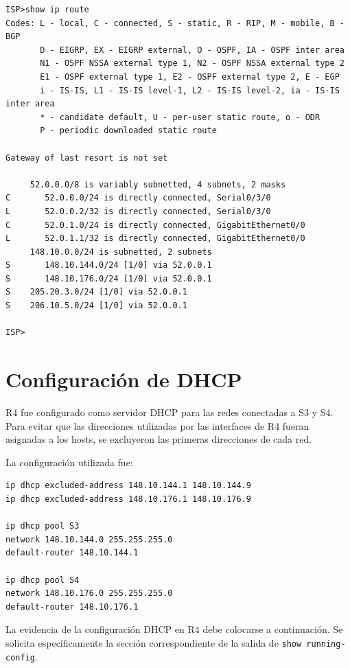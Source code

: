 \documentclass[12pt,a4paper]{article}
\begin{document}
\begin{verbatim}
ISP>show ip route
Codes: L - local, C - connected, S - static, R - RIP, M - mobile, B - BGP
       D - EIGRP, EX - EIGRP external, O - OSPF, IA - OSPF inter area
       N1 - OSPF NSSA external type 1, N2 - OSPF NSSA external type 2
       E1 - OSPF external type 1, E2 - OSPF external type 2, E - EGP
       i - IS-IS, L1 - IS-IS level-1, L2 - IS-IS level-2, ia - IS-IS inter area
       * - candidate default, U - per-user static route, o - ODR
       P - periodic downloaded static route

Gateway of last resort is not set

     52.0.0.0/8 is variably subnetted, 4 subnets, 2 masks
C       52.0.0.0/24 is directly connected, Serial0/3/0
L       52.0.0.2/32 is directly connected, Serial0/3/0
C       52.0.1.0/24 is directly connected, GigabitEthernet0/0
L       52.0.1.1/32 is directly connected, GigabitEthernet0/0
     148.10.0.0/24 is subnetted, 2 subnets
S       148.10.144.0/24 [1/0] via 52.0.0.1
S       148.10.176.0/24 [1/0] via 52.0.0.1
S    205.20.3.0/24 [1/0] via 52.0.0.1
S    206.10.5.0/24 [1/0] via 52.0.0.1

ISP>
\end{verbatim}

\section{Configuración de DHCP}

R4 fue configurado como servidor DHCP para las redes conectadas a S3 y S4. Para evitar que las direcciones utilizadas por las interfaces de R4 fueran asignadas a los hosts, se excluyeron las primeras direcciones de cada red.

La configuración utilizada fue:

\begin{lstlisting}[style=cisco]
ip dhcp excluded-address 148.10.144.1 148.10.144.9
ip dhcp excluded-address 148.10.176.1 148.10.176.9

ip dhcp pool S3
network 148.10.144.0 255.255.255.0
default-router 148.10.144.1

ip dhcp pool S4
network 148.10.176.0 255.255.255.0
default-router 148.10.176.1
\end{lstlisting}

La evidencia de la configuración DHCP en R4 debe colocarse a continuación. Se solicita específicamente la sección correspondiente de la salida de \texttt{show running-config}.
\end{document}
